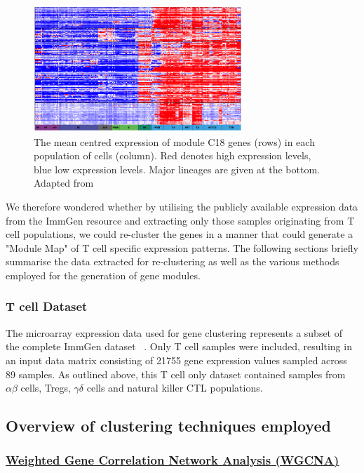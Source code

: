 \begin{figure}[H] 
    \centering
\includegraphics[width=0.7\textwidth]{Figures/Chapter3/C18_t_cell_activation.png}
\caption{\small{The mean centred expression of module C18 genes (rows) in each population of cells (column). Red denotes high expression levels, blue low expression levels. Major lineages are given at the bottom. Adapted from  ~\autocite{ImmGen}} }
    \label{fig:8}
\end{figure}

We therefore wondered whether by utilising the publicly available expression data from the ImmGen resource and extracting only those samples originating from T cell populations, we could re-cluster the genes in a manner that could generate a "Module Map" of T cell specific expression patterns. The following sections briefly summarise the data extracted for re-clustering as well as the various methods employed for the generation of gene modules. 

\subsubsection{T cell Dataset}

The microarray expression data used for gene clustering represents a subset of the complete ImmGen dataset ~\autocite{Joj2013}. Only T cell samples were included, resulting in an input data matrix consisting of 21755 gene expression values sampled across 89 samples. As outlined above, this T cell only dataset contained samples from $\alpha\beta$ cells, Tregs, $\gamma\delta$ cells and natural killer CTL populations. 

\subsection{Overview of clustering techniques employed}

\subsubsection{\underline{Weighted Gene Correlation Network Analysis (WGCNA)}}

